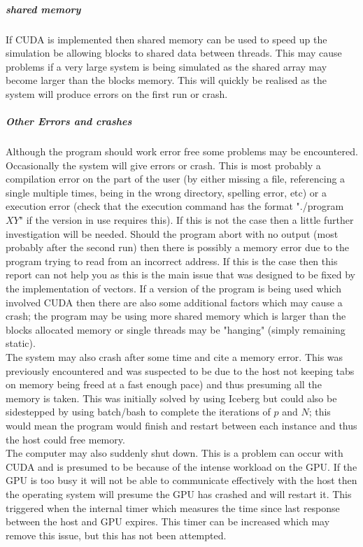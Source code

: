 \documentclass{article}
\numberwithin{equation}{section} %
\begin{document}
\subparagraph{shared memory} 
If CUDA is implemented then shared memory can be used to speed up the simulation be allowing blocks to shared data between threads. This may cause problems if a very large system is being simulated as the shared array may become larger than the blocks memory. This will quickly be realised as the system will produce errors on the first run or crash. 

\subparagraph{Other Errors and crashes}
 Although the program should work error free some problems may be encountered. Occasionally the system will give errors or crash. This is most probably a compilation error on the part of the user (by either missing a file, referencing a single multiple times, being in the wrong directory, spelling error, etc) or a execution error (check that the execution command has the format "./program $X Y$" if the version in use requires this). If this is not the case then a little further investigation will be needed. Should the program abort with no output (most probably after the second run) then there is possibly a memory error due to the program trying to read from an incorrect address. If this is the case then this report can not help you as this is the main issue that was designed to be fixed by the implementation of vectors. If a version of the program is being used which involved CUDA then there are also some additional factors which may cause a crash; the program may be using more shared memory which is larger than the blocks allocated memory or single threads may be "hanging" (simply remaining static). \\ 
 
  The system may also crash after some time and cite a memory error. This was previously encountered and was suspected to be due to the host not keeping tabs on memory being freed at a fast enough pace) and thus presuming all the memory is taken. This was initially solved by using Iceberg but could also be sidestepped by using batch/bash to complete the iterations of $p$ and $N$; this would mean the program would finish and restart between each instance and thus the host could free memory.  \\

  The computer may also suddenly shut down. This is a problem can occur with CUDA and is presumed to be because of the intense workload on the GPU. If the GPU is too busy it will not be able to communicate effectively with the host then the operating system will presume the GPU has crashed and will restart it. This triggered when the internal timer which measures the time since last response between the host and GPU expires. This timer can be increased which may remove this issue, but this has not been attempted.
\end{document}
